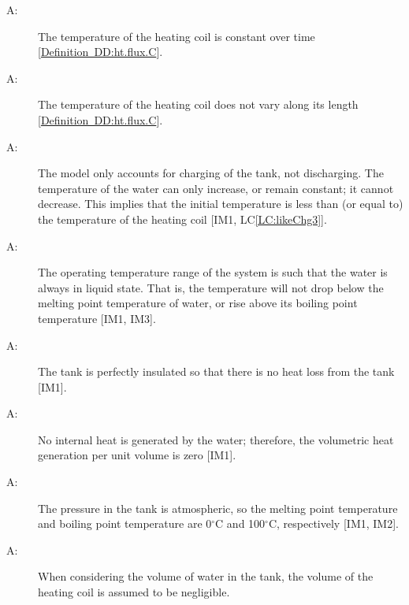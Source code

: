 \documentclass[12pt]{article}
\newcounter{assumpnum}
\newcommand{\atheassumpnum}{A\theassumpnum}
\begin{document}
\begin{description}
\item[\atheassumpnum\label{A:assump8}:]The temperature of the heating coil is constant over time {[}\hyperref[DD:ht.flux.C]{Definition~DD:ht.flux.C}{]}.
\end{description}
\begin{description}
\item[\atheassumpnum\label{A:assump9}:]The temperature of the heating coil does not vary along its length {[}\hyperref[DD:ht.flux.C]{Definition~DD:ht.flux.C}{]}.
\end{description}
\begin{description}
\item[\atheassumpnum\label{A:assump9.npnc}:]The model only accounts for charging of the tank, not discharging. The temperature of the water can only increase, or remain constant; it cannot decrease. This implies that the initial temperature is less than (or equal to) the temperature of the heating coil {[}IM1, LC\ref{LC:likeChg3}{]}.
\end{description}
\begin{description}
\item[\atheassumpnum\label{A:assump14}:]The operating temperature range of the system is such that the water is always in liquid state. That is, the temperature will not drop below the melting point temperature of water, or rise above its boiling point temperature {[}IM1, IM3{]}.
\end{description}
\begin{description}
\item[\atheassumpnum\label{A:assump15}:]The tank is perfectly insulated so that there is no heat loss from the tank {[}IM1{]}.
\end{description}
\begin{description}
\item[\atheassumpnum\label{A:assump12}:]No internal heat is generated by the water; therefore, the volumetric heat generation per unit volume is zero {[}IM1{]}.
\end{description}
\begin{description}
\item[\atheassumpnum\label{A:assump13}:]The pressure in the tank is atmospheric, so the melting point temperature and boiling point temperature are 0${}^{\circ}$C and 100${}^{\circ}$C, respectively {[}IM1, IM2{]}.
\end{description}
\begin{description}
\item[\atheassumpnum\label{A:assump20}:]When considering the volume of water in the tank, the volume of the heating coil is assumed to be negligible.
\end{description}
\end{document}
